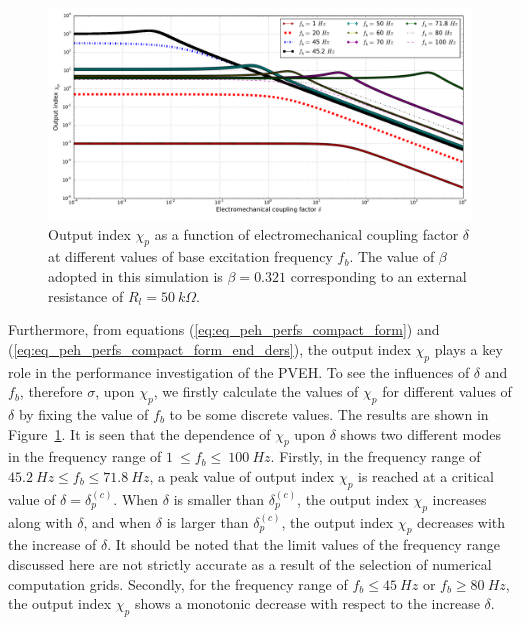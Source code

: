 \documentclass{svjour3}                     %
\begin{document}
\begin{figure}[!htbp]
    \centering
    \includegraphics[width=\textwidth]{./img_eig_asy/fig_sol_analytic_out_index_vs_delta}
    \caption{Output index $\chi_p$ as a function of electromechanical coupling factor $\delta$ at different values of base excitation frequency $f_b$. The value of $\beta$ adopted in this simulation is $\beta = 0.321$ corresponding to an external resistance of $R_l = 50\ k\Omega$. }
    \label{fig:fig_sol_analytic_out_index_vs_delta}
\end{figure}

Furthermore, from equations (\ref{eq:eq_peh_perfs_compact_form}) and (\ref{eq:eq_peh_perfs_compact_form_end_ders}), the output index $\chi_p$ plays a key role in the performance investigation of the PVEH. To see the influences of $\delta$ and $f_b$, therefore $\sigma$, upon $\chi_p$, we firstly calculate the values of $\chi_p$ for different values of $\delta$ by fixing the value of $f_b$ to be some discrete values. The results are shown in Figure~\ref{fig:fig_sol_analytic_out_index_vs_delta}. It is seen that the dependence of $\chi_p$ upon $\delta$ shows two different modes in the frequency range of $1\ \leq f_b \leq \ 100\ Hz$. Firstly, in the frequency range of $45.2\ Hz \leq f_b \leq 71.8\ Hz$, a peak value of output index $\chi_p$ is reached at a critical value of $\delta = \delta_p^{(c)}$. When $\delta$ is smaller than $\delta_p^{(c)}$, the output index $\chi_p$ increases along with $\delta$, and when $\delta$ is larger than $\delta_p^{(c)}$, the output index $\chi_p$ decreases with the increase of $\delta$. It should be noted that the limit values of the frequency range discussed here are not strictly accurate as a result of the selection of numerical computation grids. Secondly, for the frequency range of $f_b \leq 45\ Hz$ or $f_b \geq 80\ Hz$, the output index $\chi_p$ shows a monotonic decrease with respect to the increase $\delta$.
\end{document}
